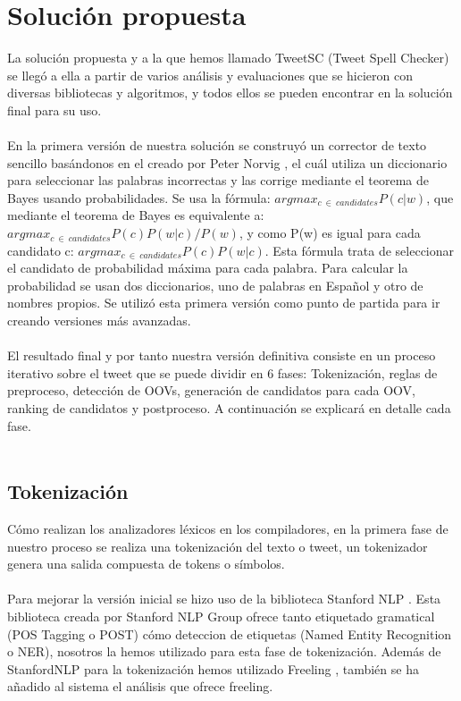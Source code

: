 \documentclass[spanish,12pt, a4paper,twoside]{paper}
\let\oldsection\section
\def\section{\cleardoublepage\oldsection}
\begin{document}
\section{Solución propuesta}\label{sec:solucionpropuesta}
La solución propuesta y a la que hemos llamado TweetSC (Tweet Spell Checker) \cite{tweetscweb} se llegó a ella a partir de varios análisis y evaluaciones que se hicieron con diversas bibliotecas y algoritmos, y todos ellos se pueden encontrar en la solución final para su uso.\\\\
En la primera versión de nuestra solución se construyó un corrector de texto sencillo basándonos en el creado por Peter Norvig \cite{peternorvig}, el cuál utiliza un diccionario para seleccionar las palabras incorrectas y las corrige mediante el teorema de Bayes usando probabilidades. Se usa la fórmula: $argmax_{c\ \in\  candidates}P(c|w)$, que mediante el teorema de Bayes es equivalente a: $argmax_{c\ \in\  candidates}P(c) P(w|c) / P(w)$, y como P(w) es igual para cada candidato c: $argmax_{c\ \in\  candidates}P(c) P(w|c)$. Esta fórmula trata de seleccionar el candidato de probabilidad máxima para cada palabra. Para calcular la probabilidad se usan dos diccionarios, uno de palabras en Español y otro de nombres propios. Se utilizó esta primera versión como punto de partida para ir creando versiones más avanzadas.\\\\

El resultado final y por tanto nuestra versión definitiva consiste en un proceso iterativo sobre el tweet que se puede dividir en 6 fases: Tokenización, reglas de preproceso, detección de OOVs, generación de candidatos para cada OOV, ranking de candidatos y postproceso. A continuación se explicará en detalle cada fase.\\\\

\subsection{Tokenización}\label{sec:tokenizacion}
Cómo realizan los analizadores léxicos en los compiladores, en la primera fase de nuestro proceso se realiza una tokenización del texto o tweet, un tokenizador genera una salida compuesta de tokens o símbolos.\\\\

Para mejorar la versión inicial se hizo uso de la biblioteca Stanford NLP \cite{stanfordnlp}. Esta biblioteca creada por Stanford NLP Group ofrece tanto etiquetado gramatical (POS Tagging o POST) cómo deteccion de etiquetas (Named Entity Recognition o NER), nosotros la hemos utilizado para esta fase de tokenización. Además de StanfordNLP para la tokenización hemos utilizado Freeling \cite{freeling}, también se ha añadido al sistema el análisis que ofrece freeling.\\\\
\end{document}
